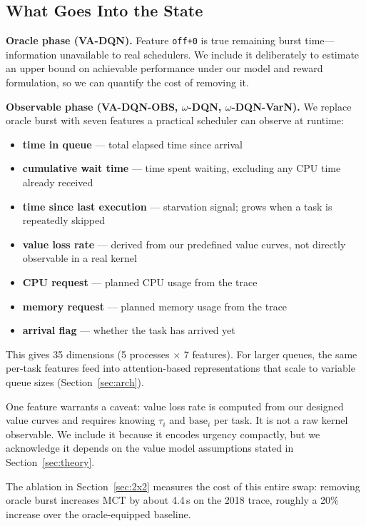 \documentclass[10pt,twocolumn]{article}
\theoremstyle{remark}
\newcommand{\vadqn}{VA-DQN}
\newcommand{\vaobs}{VA-DQN-OBS}
\newcommand{\omegadqn}{$\omega$-DQN}
\newcommand{\omegavarn}{$\omega$-DQN-VarN}
\begin{document}
\subsection{What Goes Into the State}

\textbf{Oracle phase (\vadqn).} Feature \texttt{off+0} is true
remaining burst time---information unavailable to real schedulers.
We include it deliberately to estimate an upper bound on achievable
performance under our model and reward formulation, so we can
quantify the cost of removing it.

\textbf{Observable phase (\vaobs, \omegadqn, \omegavarn).} We
replace oracle burst with seven features a practical scheduler can
observe at runtime:

\begin{itemize}[itemsep=2pt]
  \item \textbf{time in queue} --- total elapsed time since arrival
  \item \textbf{cumulative wait time} --- time spent waiting,
    excluding any CPU time already received
  \item \textbf{time since last execution} --- starvation signal;
    grows when a task is repeatedly skipped
  \item \textbf{value loss rate} --- derived from our predefined
    value curves, not directly observable in a real kernel
  \item \textbf{CPU request} --- planned CPU usage from the trace
  \item \textbf{memory request} --- planned memory usage from the
    trace
  \item \textbf{arrival flag} --- whether the task has arrived yet
\end{itemize}

This gives 35 dimensions (5 processes $\times$ 7 features). For
larger queues, the same per-task features feed into
attention-based representations that scale to variable queue sizes
(Section~\ref{sec:arch}).

One feature warrants a caveat: value loss rate is computed from our
designed value curves and requires knowing $\tau_i$ and
$\mathrm{base}_i$ per task. It is not a raw kernel observable. We
include it because it encodes urgency compactly, but we acknowledge
it depends on the value model assumptions stated in
Section~\ref{sec:theory}.

The ablation in Section~\ref{sec:2x2} measures the cost of this
entire swap: removing oracle burst increases MCT by about 4.4\,s on
the 2018 trace, roughly a 20\% increase over the oracle-equipped
baseline.
\end{document}
